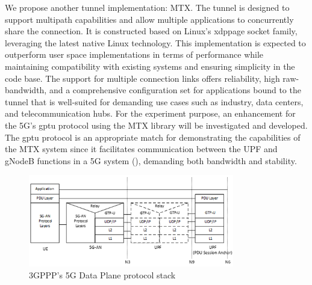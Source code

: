 We propose another tunnel implementation: \ac{MTX}. 
The tunnel is designed to support multipath capabilities and allow multiple applications to concurrently share the connection. 
It is constructed based on Linux's \ac{xdppage} socket family, leveraging the latest native Linux technology. 
This implementation is expected to outperform user space implementations in terms of performance while maintaining compatibility with existing systems and ensuring simplicity in the code base.
The support for multiple connection links offers reliability, high raw-bandwidth, and a comprehensive configuration set for applications bound to the tunnel that is well-suited for demanding use cases such as industry, data centers, and telecommunication hubs.
For the experiment purpose, an enhancement for the 5G's \ac{gptu} protocol using the \ac{MTX} library will be investigated and developed. 
The \ac{gptu} protocol is an appropriate match for demonstrating the capabilities of the \ac{MTX} system since it facilitates communication between the UPF and gNodeB functions in a 5G system (), demanding both bandwidth and stability.
%

\begin{figure}[H]
	\centering
	\includegraphics[width=0.8\textwidth]{resources/images/3gpp_5g_data_plane_protocol.png}
	\caption{3GPPP's 5G Data Plane protocol stack \cite{3gpp_5g_system_overview}}
    \label{fig:introduction:3gpp_5g_data_plane_protocol}
\end{figure}


